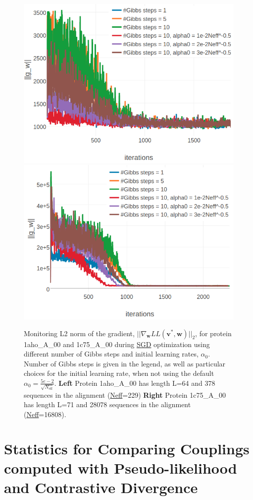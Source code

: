 \documentclass[11pt,a4paper,twoside]{book}
\renewcommand{\v}{\mathbf{v}}
\newcommand{\w}{\mathbf{w}}
\theoremstyle{definition}
\theoremstyle{definition}
\theoremstyle{remark}
\begin{document}
\begin{figure}

{\centering \includegraphics[width=0.48\linewidth]{img/full_likelihood/gibbs_sampling/gradient_norm_1ahoa00} \includegraphics[width=0.48\linewidth]{img/full_likelihood/gibbs_sampling/gradient_norm_1c75a00} 

}

\caption{Monitoring L2 norm
of the gradient, \(||\nabla_{\w} L\!L(\v^*, \w)||_2\), for protein
1aho\_A\_00 and 1c75\_A\_00 during \protect\hyperlink{abbrev}{SGD}
optimization using different number of Gibbs steps and initial learning
rates, \(\alpha_0\). Number of Gibbs steps is given in the legend, as
well as particular choices for the initial learning rate, when not using
the default \(\alpha_0 = \frac{5e-2}{\sqrt{N_{\text{eff}}}}\).
\textbf{Left} Protein 1aho\_A\_00 has length L=64 and 378 sequences in
the alignment (\protect\hyperlink{abbrev}{Neff}=229) \textbf{Right}
Protein 1c75\_A\_00 has length L=71 and 28078 sequences in the alignment
(\protect\hyperlink{abbrev}{Neff}=16808).}\label{fig:cd-gibbssteps-single-proteins-gradient}
\end{figure}

\section{Statistics for Comparing Couplings computed with
Pseudo-likelihood and Contrastive
Divergence}\label{statistics-for-comparing-couplings-computed-with-pseudo-likelihood-and-contrastive-divergence}
\end{document}
